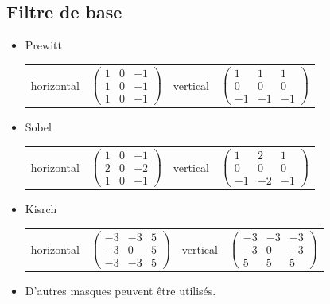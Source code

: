 \documentclass[11pt]{article}
\begin{document}
	\subsection{Filtre de base} 

	\begin{itemize}
		\item Prewitt

			\begin{tabular}{cccc}
				horizontal &
				$
				\begin{pmatrix}
					1 & 0 & -1 \\
					1 & 0 & -1 \\
					1 & 0 & -1
				\end{pmatrix}
				$
				&
				vertical &
				$
				\begin{pmatrix}
				1 & 1 & 1 \\
				0 & 0 & 0 \\
				-1 & -1 & -1
				\end{pmatrix}
				$
			\end{tabular}

		\item Sobel

			\begin{tabular}{cccc}
				horizontal &
				$
				\begin{pmatrix}
				1 & 0 & -1 \\
				2 & 0 & -2 \\
				1 & 0 & -1
				\end{pmatrix}
				$
				&
				vertical &
				$
				\begin{pmatrix}
				1 & 2 & 1 \\
				0 & 0 & 0 \\
				-1 & -2 & -1
				\end{pmatrix}
				$
			\end{tabular}

		\item Kisrch

			\begin{tabular}{cccc}
				horizontal &
				$
				\begin{pmatrix}
				-3 & -3 & 5 \\
				-3 & 0 & 5 \\
				-3 & -3 & 5
				\end{pmatrix}
				$
				&
				vertical &
				$
				\begin{pmatrix}
				-3 & -3 & -3 \\
				-3 & 0 & -3 \\
				5 & 5 & 5
				\end{pmatrix}
				$
			\end{tabular}
			
			\item D'autres masques peuvent être utilisés.
	\end{itemize}
\end{document}
